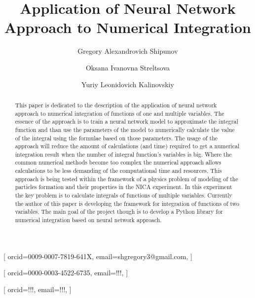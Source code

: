 \documentclass[%
]{ittmm}
\begin{document}


\title{Application of Neural Network Approach to Numerical Integration}


\author[1]{Gregory Alexandrovich Shipunov}[%
orcid=0009-0007-7819-641X,
email=shgregory3@gmail.com,
]
\cormark[1]

\author[2]{Oksana Ivanovna Streltsova}[%
orcid=0000-0003-4522-6735,
email=!!!,
]

\author[2]{Yuriy Leonidovich Kalinovskiy}[%
orcid=!!!,
email=!!!,
]
\address[1]{Dubna State University,
  19 Universitetskaya St, Dubna, 141980, Russian Federation}
\address[2]{Joint Institute for Nuclear Research,
  6 Joliot-Curie St, Dubna, 141980, Russian Federation}


\begin{abstract}
    This paper is dedicated to the description of the application of neural network approach to numerical integration of functions of one and multiple variables. The essence of the approach is to train a neural network model to approximate the integral function and than use the parameters of the model to numerically calculate the value of the integral using the formulae based on those parameters. The usage of the approach will reduce the amount of calculations (and time) required to get a numerical integration result when the number of integral function's variables is big. Where the common numerical methods become too complex the numerical approach allows calculations to be less demanding of the computational time and resources. This approach is being tested within the framework of a physics problem of modeling of the particles formation and their properties in the NICA experiment. In this experiment the key problem is to calculate integrals of functions of multiple variables. Currently the author of this paper is developing the framework for integration of functions of two variables. The main goal of the project though is to develop a Python library for numerical integration based on neural network approach.

\end{abstract}
\end{document}

